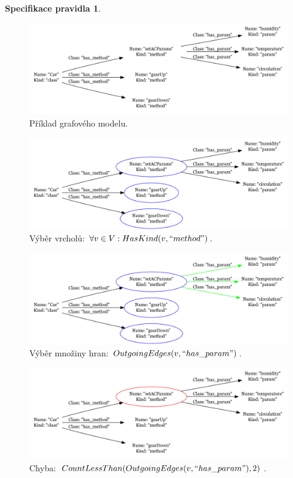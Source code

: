 \documentclass{beamer}
\newtheorem*{rulemathspec}{Specifikace pravidla}
\begin{document}
\begin{frame}
{\begin{rulemathspec}
    \end{rulemathspec}
  }
   {
    \begin{figure}[h!]
      \centering
      \includegraphics[width=1.0\textwidth]{./graphs/graph_example1.png}
      \caption{Příklad grafového modelu.}
    \end{figure}
  }
   {
    \begin{figure}[h!]
      \centering
      \includegraphics[width=1.0\textwidth]{./graphs/graph_example2.png}
      \caption{Výběr vrcholů: $\forall v \in V : HasKind(v, ``method")$.}
    \end{figure}
  }
   {
    \begin{figure}[h!]
      \centering
      \includegraphics[width=1.0\textwidth]{./graphs/graph_example3.png}
      \caption{Výběr množiny hran: $OutgoingEdges(v, ``has\_param")$.}
    \end{figure}
  }
   {
    \begin{figure}[h!]
      \centering
      \includegraphics[width=1.0\textwidth]{./graphs/graph_example4.png}
      \caption{Chyba: $CountLessThan(OutgoingEdges(v, ``has\_param"), 2)$.}
    \end{figure}
  }
\end{frame}
\end{document}
